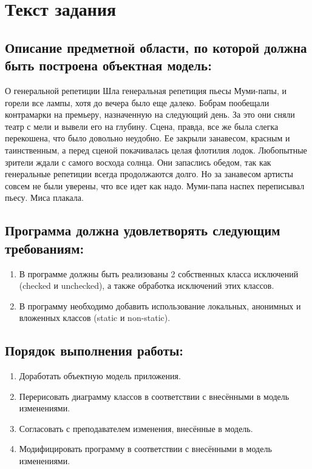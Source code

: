 \documentclass{article}
\begin{document}
\itmo[
  variant=15677557.5,
  labn=4,
  discipline=Программирование,
  group=P3115,
  student=Владимир Мацюк,
  teacher=Сорокин Роман Борисович
]

\section{Текст задания}
\subsection{Описание предметной области, по которой должна быть построена объектная модель:}

О генеральной репетиции Шла генеральная репетиция пьесы Муми-папы, и горели все лампы, хотя до вечера было еще далеко. Бобрам пообещали контрамарки на премьеру, назначенную на следующий день. За это они сняли театр с мели и вывели его на глубину. Сцена, правда, все же была слегка перекошена, что было довольно неудобно. Ее закрыли занавесом, красным и таинственным, а перед сценой покачивалась целая флотилия лодок. Любопытные зрители ждали с самого восхода солнца. Они запаслись обедом, так как генеральные репетиции всегда продолжаются долго. Но за занавесом артисты совсем не были уверены, что все идет как надо. Муми-папа наспех переписывал пьесу. Миса плакала.

\subsection{Программа должна удовлетворять следующим требованиям:}
\begin{enumerate}
  \item В программе должны быть реализованы 2 собственных класса исключений (checked и unchecked), а также обработка исключений этих классов.
  \item В программу необходимо добавить использование локальных, анонимных и вложенных классов (static и non-static).
\end{enumerate}
\subsection{Порядок выполнения работы:}
\begin{enumerate}
  \item Доработать объектную модель приложения.
  \item Перерисовать диаграмму классов в соответствии с внесёнными в модель изменениями.
  \item Согласовать с преподавателем изменения, внесённые в модель.
  \item Модифицировать программу в соответствии с внесёнными в модель изменениями.
\end{enumerate}
\end{document}
